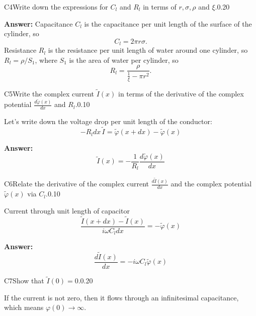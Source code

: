 \documentclass[11pt,a4paper]{article}
\begin{document}
\begin{solcard}{C4}{Write down the expressions for $C_l$ and $R_l$ in terms of $r,\sigma,\rho$ and $\xi$.}{0.20}
\par\smallskip\noindent\textbf{Answer:} Capacitance $C_l$ is the capacitance per unit length of the surface of the cylinder, so \[C_l=2\pi r \sigma.\] Resistance $R_l$ is the resistance per unit length of water around one cylinder, so $R_l = \rho / S_1$, where $S_1$ is the area of water per cylinder, so \[ R_l = \frac{\rho}{\frac{1}{\xi}-\pi r^2}. \]
\end{solcard}

\begin{solcard}{C5}{Write the complex current $\tilde{I}(x)$ in terms of the derivative of the complex potential $\frac{d\tilde{\varphi}(x)}{dx}$ and $R_l$.}{0.10}

Let's write down the voltage drop per unit length of the conductor: \[ -R_ldx \, \tilde{I}  = \tilde{\varphi}(x+dx) - \tilde{\varphi}(x)  \]

\par\smallskip\noindent\textbf{Answer:} \[ \tilde{I}(x) = -\frac{1}{R_l}\frac{d\tilde{\varphi}(x)}{dx} \]
\end{solcard}

\begin{solcard}{C6}{Relate the derivative of the complex current $\frac{d\tilde{I}(x)}{dx}$ and the complex potential $\tilde{\varphi}(x)$ via $C_l$.}{0.10}

Current through unit length of capacitor \[ \frac{\tilde{I}(x+dx) - \tilde{I}(x)}{i\omega C_l dx} = -\tilde{\varphi} (x) \]

\par\smallskip\noindent\textbf{Answer:} \[ \frac{d \tilde{I}(x)}{d x} = -i \omega C_l \tilde{\varphi}(x) \]
\end{solcard}

\begin{solcard}{C7}{Show that $\tilde{I}(0) = 0$.}{0.20}

If the current is not zero, then it flows through an infinitesimal capacitance, which means $\varphi(0) \to \infty$.

\end{solcard}
\end{document}
